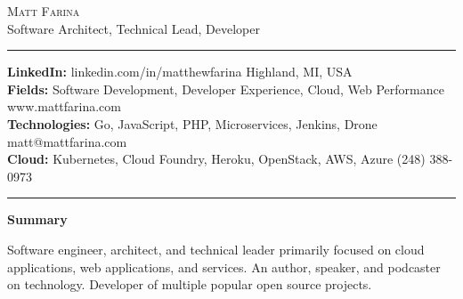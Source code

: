 \documentclass[10pt,A4]{article}
\newcommand{\cvsection}[1]
{
	\begin{center}
		\large\textcolor{sectcol}{\textbf{#1}}
	\end{center}
}
\newcommand{\metasection}[2]
{
\footnotesize{#2} \hspace*{\fill} \footnotesize{#1}\\[1pt]
}
\begin{document}
\pagestyle{fancy}	








\vspace{-8pt}
\begin{center}
	\HUGE \textsc{Matt Farina}\\[2pt]
	\small Software Architect, Technical Lead, Developer
\end{center}

\textcolor{sectcol}{\hrule}

\vspace{6pt}


\metasection{Highland, MI, USA}{\textbf{LinkedIn:} linkedin.com/in/matthewfarina}
\metasection{www.mattfarina.com}{\textbf{Fields:} Software Development, Developer Experience, Cloud, Web Performance} 
\metasection{matt@mattfarina.com}{\textbf{Technologies:} Go, JavaScript, PHP, Microservices, Jenkins, Drone}
\metasection{(248) 388-0973}{\textbf{Cloud:} Kubernetes, Cloud Foundry, Heroku, OpenStack, AWS, Azure}
\vspace{-4pt}
\textcolor{sectcol}{\hrule}
\vspace{6pt}

\normalsize

\vspace{-6pt}
\cvsection{Summary}
Software engineer, architect, and technical leader primarily focused on cloud applications, web applications, and services. An author, speaker, and podcaster on technology. Developer of multiple popular open source projects.\
\end{document}
